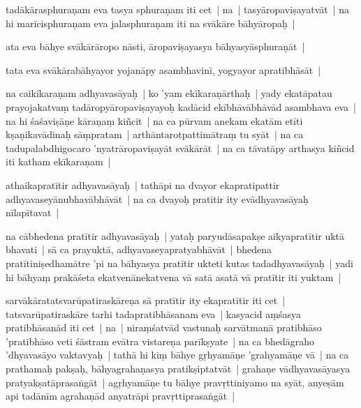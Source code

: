 \documentclass[article,a4paper]{memoir}
\begin{document}
	  \pstart tadā\-kā\-rasphuraṇam eva tasya sphuraṇam iti cet | na | tasyā\-ropaviṣayatvā\-t | na hi marī\-cisphuraṇam eva jalasphuraṇam iti na svā\-kā\-re bā\-hyā\-ropaḥ |
	\pend
      

	  \pstart ata eva bā\-hye svā\-kā\-rā\-ropo nā\-sti, ā\-ropaviṣayasya bā\-hyasyā\-sphuraṇā\-t |
	\pend
      

	  \pstart tata eva svā\-kā\-rabā\-hyayor yojanā\-py asambhavinī\-, yogyayor apratibhā\-sā\-t |
	\pend
      

	  \pstart na caikī\-karaṇam adhyavasā\-yaḥ | ko 'yam ekī\-karaṇā\-rthaḥ | yady ekatā\-patau prayojakatvaṃ tadā\-ropyā\-ropaviṣayayoḥ kadā\-cid ekī\-bhā\-vā\-bhā\-vā\-d asambhava eva | na hi śaśaviṣā\-ṇe kā\-raṇaṃ kiñcit | na ca pū\-rvam anekam ekatā\-m etī\-ti kṣaṇikavā\-dinaḥ sā\-ṃpratam | arthā\-ntarotpattimā\-traṃ tu syā\-t | na ca tadupalabdhigocaro 'nyatrā\-ropaviṣayā\-t svā\-kā\-rā\-t | na ca tā\-vatā\-py arthasya kiñcid iti katham ekī\-karaṇam |
	\pend
      

	  \pstart athaikapratī\-tir adhyavasā\-yaḥ | tathā\-pi na dvayor ekapratipattir adhyavaseyā\-nubhavā\-bhā\-vā\-t | na ca dvayoḥ pratī\-tir ity evā\-dhyavasā\-yaḥ nī\-lapī\-tavat | \label{thakur75-134.27}
	\pend
      

	  \pstart na cā\-bhedena pratī\-tir adhyavasā\-yaḥ | yataḥ paryudā\-sapakṣe aikyapratī\-tir uktā\- bhavati | sā\- ca prayuktā\-, adhyavaseyapratyabhā\-vā\-t | bhedena pratī\-tiniṣedhamā\-tre 'pi na bā\-hyasya pratī\-tir ukteti kutas tadadhyavasā\-yaḥ | yadi hi bā\-hyaṃ prakā\-śeta ekatvenā\-nekatvena vā\- satā\- asatā\- vā\- pratī\-tir iti yuktam | 
	\pend
      

	  \pstart sarvā\-kā\-ratatsvarū\-patiraskā\-reṇa sā\- pratī\-tir ity ekapratī\-tir iti cet | tatsvarū\-patiraskā\-re tarhi tadapratibhā\-sanam eva | kasyacid aṃśasya pratibhā\-sanā\-d iti cet | na | niraṃśatvā\-d vastunaḥ sarvā\-tmanā\- pratibhā\-so 'pratibhā\-so veti śā\-stram evā\-tra vistareṇa parī\-kṣyate | \label{thakur75-135.1} na ca bhedā\-graho 'dhyavasā\-yo vaktavyaḥ | tathā\- hi kiṃ bā\-hye gṛhyamā\-ṇe 'grahyamā\-ṇe vā\- | na ca prathamaḥ pakṣaḥ, bā\-hyagrahaṇasya pratikṣiptatvā\-t | grahaṇe vā\-dhyavasā\-yasya pratyakṣatā\-prasaṅgā\-t | agṛhyamā\-ṇe tu bā\-hye pravṛttiniyamo na syā\-t, anyeṣā\-m api tadā\-nī\-m agrahaṇā\-d anyatrā\-pi pravṛttiprasaṅgā\-t |
	\pend
      
\end{document}
